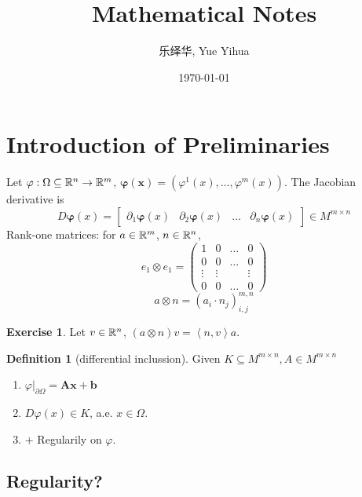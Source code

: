 \documentclass{amsart}
\author{乐绎华, Yue Yihua}
\date{\today}
\title{Mathematical Notes}
\let\originalmathbb\mathbb
\renewcommand{\mathbb}[1]{%
    \ifstrequal{#1}{1}{\mathbbm{#1}}{\originalmathbb{#1}}%
}
\theoremstyle{plain}
\theoremstyle{definition}
\newtheorem{definition}[theorem]{Definition}
\newtheorem{exercise}[theorem]{Exercise}
\theoremstyle{remark}
\begin{document}
\maketitle
\tableofcontents

\section{Introduction of Preliminaries}

Let $\varphi:\Omega \subseteq \mathbb{R}^{n}\to \mathbb{R}^{m}$, $\boldsymbol{\varphi}(\boldsymbol{x})=(\varphi^{1}(x),\dots,\varphi^{m}(x))$. The Jacobian derivative is
\[
D\boldsymbol{\varphi}(x)=\begin{bmatrix}
\partial_1\boldsymbol{\varphi}(x) & \partial _{2}\boldsymbol{\varphi}(x) & \dots & \partial _n\boldsymbol{\varphi}(x)
\end{bmatrix}\in M^{m\times n}
\]
Rank-one matrices: for $a\in \mathbb{R}^{m}$, $n\in \mathbb{R}^{n}$,
\[
e_1\otimes e_1=\begin{pmatrix}
1 & 0 & \dots & 0 \\
0 & 0 & \dots & 0 \\
\vdots & \vdots &  & \vdots \\
0 & 0 & \dots & 0
\end{pmatrix}
\]
\[
a\otimes n=(a_i\cdot n_j)_{i,j}^{m,n}
\]
\begin{exercise}
Let $v\in \mathbb{R}^{n}$, $(a\otimes n) v= \left< n,v \right>a$.
\end{exercise}
\begin{definition}[differential inclussion]
Given $K\subseteq M^{m\times n}, A\in M^{m\times n}$
	\begin{enumerate}
		\item $\left.\varphi\right|_{\partial \Omega}=\mathbf{A}\mathbf{x}+\mathbf{b}$
		\item $D\varphi (x)\in K$, a.e. $x\in \Omega$.
		\item $+$ Regularily on $\varphi$.
	\end{enumerate}
\end{definition}
\subsection{Regularity?}
\end{document}
